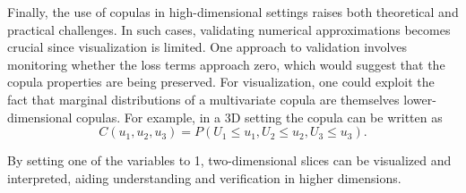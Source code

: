 Finally, the use of copulas in high-dimensional settings raises both theoretical and practical challenges. In such cases, validating numerical approximations becomes crucial since visualization is limited. One approach to validation involves monitoring whether the loss terms approach zero, which would suggest that the copula properties are being preserved. For visualization, one could exploit the fact that marginal distributions of a multivariate copula are themselves lower-dimensional copulas. For example, in a 3D setting the copula can be written as 
\[
    C(u_1, u_2, u_3) = P(U_1 \leq u_1, U_2 \leq u_2, U_3 \leq u_3).
\]

By setting one of the variables to 1, two-dimensional slices can be visualized and interpreted, aiding understanding and verification in higher dimensions.











